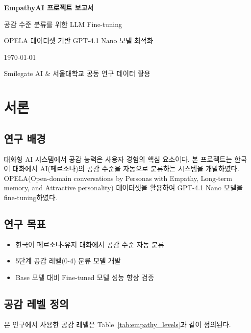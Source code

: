 \documentclass[12pt, a4paper]{article}
\begin{document}
\begin{titlepage}
    \centering
    \vspace*{3cm}
    {\Huge\bfseries\color{primary} EmpathyAI 프로젝트 보고서\par}
    \vspace{1cm}
    {\Large 공감 수준 분류를 위한 LLM Fine-tuning\par}
    \vspace{2cm}
    {\large OPELA 데이터셋 기반 GPT-4.1 Nano 모델 최적화\par}
    \vspace{3cm}
    {\large \today\par}
    \vfill
    {\normalsize Smilegate AI \& 서울대학교 공동 연구 데이터 활용\par}
\end{titlepage}

\tableofcontents
\newpage

\section{서론}

\subsection{연구 배경}
대화형 AI 시스템에서 공감 능력은 사용자 경험의 핵심 요소이다. 
본 프로젝트는 한국어 대화에서 AI(페르소나)의 공감 수준을 자동으로 분류하는 시스템을 개발하였다.
OPELA(Open-domain conversations by Personas with Empathy, Long-term memory, and Attractive personality) 
데이터셋을 활용하여 GPT-4.1 Nano 모델을 fine-tuning하였다.

\subsection{연구 목표}
\begin{itemize}
    \item 한국어 페르소나-유저 대화에서 공감 수준 자동 분류
    \item 5단계 공감 레벨(0-4) 분류 모델 개발
    \item Base 모델 대비 Fine-tuned 모델 성능 향상 검증
\end{itemize}

\subsection{공감 레벨 정의}
본 연구에서 사용한 공감 레벨은 Table~\ref{tab:empathy_levels}과 같이 정의된다.
\end{document}
